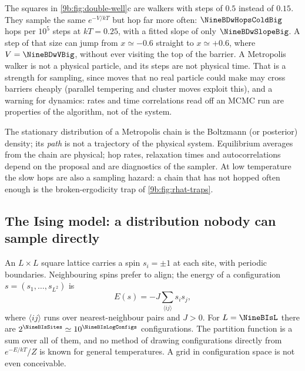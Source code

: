 The squares in \cref{9b:fig:double-well}c are walkers with steps of $0.5$ instead of $0.15$.
They sample the same $e^{-V/kT}$ but hop far more often: $\NineBDwHopsColdBig$ hops per $10^5$
steps at $kT=0.25$, with a fitted slope of only $\NineBDwSlopeBig$. A step of that size can jump
from $x\simeq-0.6$ straight to $x\simeq+0.6$, where $V=\NineBDwVBig$, without ever visiting the
top of the barrier. A Metropolis walker is not a physical particle, and its steps are not physical
time. That is a strength for sampling, since moves that no real particle could make may cross
barriers cheaply (parallel tempering and cluster moves exploit this), and a warning for dynamics:
rates and time correlations read off an MCMC run are properties of the algorithm, not of the
system.

\begin{pitfall}
The stationary distribution of a Metropolis chain is the Boltzmann (or posterior) density; its
\emph{path} is not a trajectory of the physical system. Equilibrium averages from the chain are
physical; hop rates, relaxation times and autocorrelations depend on the proposal and are
diagnostics of the sampler. At low temperature the slow hops are also a sampling hazard: a chain
that has not hopped often enough is the broken-ergodicity trap of \cref{9b:fig:rhat-traps}.
\end{pitfall}

\subsection{The Ising model: a distribution nobody can sample directly}
\label{9b:sec:ising}

An $L\times L$ square lattice carries a spin $s_i=\pm1$ at each site, with periodic boundaries.
Neighbouring spins prefer to align; the energy of a configuration $s=(s_1,\dots,s_{L^2})$ is
\begin{equation}
  E(s)=-J\sum_{\langle ij\rangle}s_is_j ,
  \label{9b:eq:ising}
\end{equation}
where $\langle ij\rangle$ runs over nearest-neighbour pairs and $J>0$. For $L=\NineBIsL$ there
are $2^{\NineBIsSites}\simeq10^{\NineBIsLogConfigs}$ configurations. The partition function is a
sum over all of them, and no method of drawing configurations directly from $e^{-E/kT}/Z$ is
known for general temperatures. A grid in configuration space is not even conceivable.

